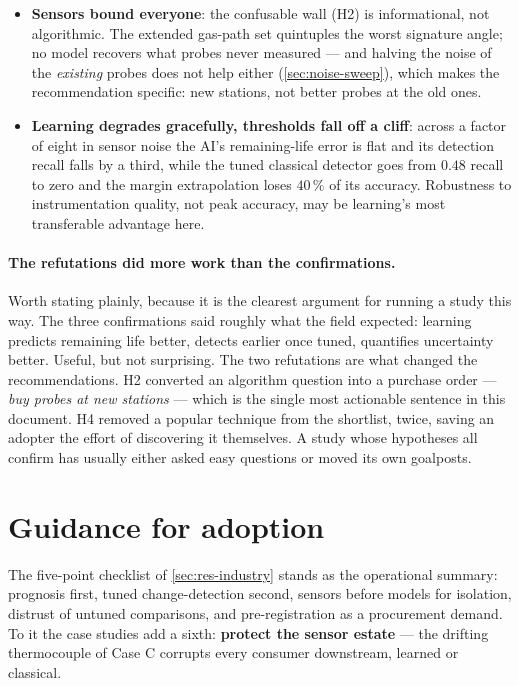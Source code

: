 \begin{itemize}
    consuming this engine --- has an answer the instantaneous inverse problem does not.
  \item \textbf{Sensors bound everyone}: the confusable wall (H2) is informational, not
    algorithmic. The extended gas-path set quintuples the worst signature angle; no model
    recovers what probes never measured --- and halving the noise of the \emph{existing}
    probes does not help either (\cref{sec:noise-sweep}), which makes the recommendation
    specific: new stations, not better probes at the old ones.
  \item \textbf{Learning degrades gracefully, thresholds fall off a cliff}: across a factor of
    eight in sensor noise the AI's remaining-life error is flat and its detection recall falls
    by a third, while the tuned classical detector goes from $0.48$ recall to zero and the
    margin extrapolation loses $40\,\%$ of its accuracy. Robustness to instrumentation quality,
    not peak accuracy, may be learning's most transferable advantage here.
\end{itemize}

\paragraph{The refutations did more work than the confirmations.} Worth stating plainly,
because it is the clearest argument for running a study this way. The three confirmations
said roughly what the field expected: learning predicts remaining life better, detects
earlier once tuned, quantifies uncertainty better. Useful, but not surprising. The two
refutations are what changed the recommendations. H2 converted an algorithm question into a
purchase order --- \emph{buy probes at new stations} --- which is the single most actionable
sentence in this document. H4 removed a popular technique from the shortlist, twice, saving
an adopter the effort of discovering it themselves. A study whose hypotheses all confirm has
usually either asked easy questions or moved its own goalposts.

\section{Guidance for adoption}

The five-point checklist of \cref{sec:res-industry} stands as the operational summary:
prognosis first, tuned change-detection second, sensors before models for isolation,
distrust of untuned comparisons, and pre-registration as a procurement demand. To it the
case studies add a sixth: \textbf{protect the sensor estate} --- the drifting thermocouple
of Case C corrupts every consumer downstream, learned or classical.

